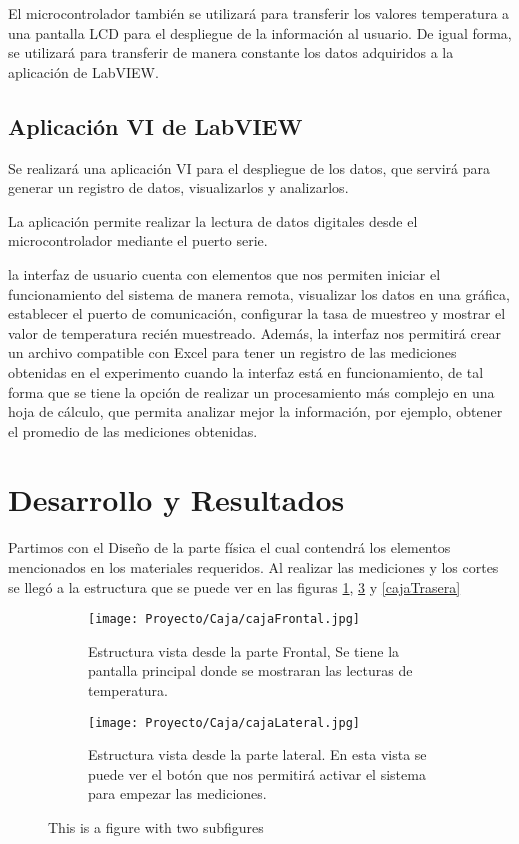El microcontrolador también se utilizará para transferir los valores temperatura a una pantalla LCD para el despliegue de la información al usuario. De igual forma, se utilizará para transferir de manera constante los datos adquiridos a la aplicación de LabVIEW.

\subsection{Aplicación VI de LabVIEW}

Se realizará una aplicación VI para el despliegue de los datos, que servirá para generar un registro de datos, visualizarlos y analizarlos.

La aplicación permite realizar la lectura de datos digitales desde el microcontrolador mediante el puerto serie.

la interfaz de usuario cuenta con elementos que nos permiten iniciar el funcionamiento del sistema de manera remota, visualizar los datos en una gráfica, establecer el puerto de comunicación, configurar la tasa de muestreo y mostrar el valor de temperatura recién muestreado. Además, la interfaz nos permitirá crear un archivo compatible con Excel para tener un registro de las mediciones obtenidas en el experimento cuando la interfaz está en funcionamiento, de tal forma que se tiene la opción de realizar un procesamiento más complejo en una hoja de cálculo, que permita analizar mejor la información, por ejemplo, obtener el promedio de las mediciones obtenidas.


\section{Desarrollo y Resultados}

Partimos con el Diseño de la parte física el cual contendrá los elementos mencionados en los materiales requeridos. Al realizar las mediciones y los cortes se llegó a la estructura que se puede ver en las figuras \ref{cajaFrontal}, \ref{cajaLateral} y \ref{cajaTrasera}

\begin{figure}[!h]
\begin{subfigure}[h]{0.35\linewidth}
\texttt{[image: Proyecto/Caja/cajaFrontal.jpg]}
\caption{Estructura vista desde la parte Frontal, Se tiene la pantalla principal donde se mostraran las lecturas de temperatura.}
\label{cajaFrontal}
\end{subfigure}
\hfill
\begin{subfigure}[h]{0.35\linewidth}
\texttt{[image: Proyecto/Caja/cajaLateral.jpg]}
\caption{Estructura vista desde la parte lateral. En esta vista se puede ver el botón que nos permitirá activar el sistema para empezar las mediciones.}
 \label{cajaLateral}
\end{subfigure}%
\caption{This is a figure with two subfigures}
\end{figure}

